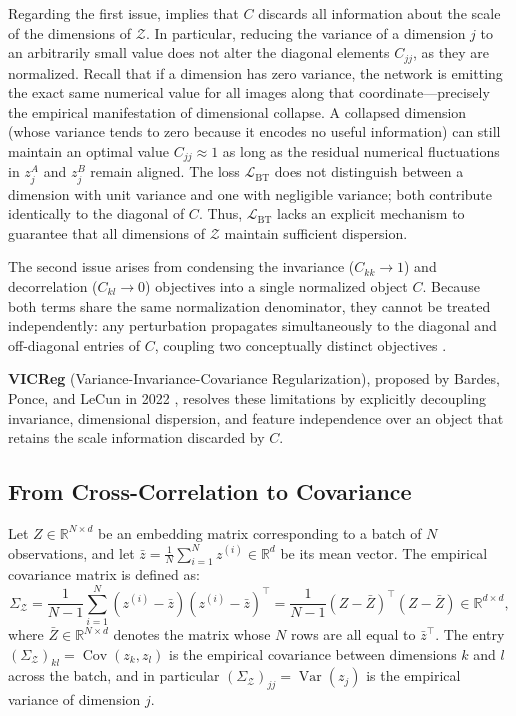\documentclass[11pt, oneside, openany]{book}
\DeclareMathOperator{\Var}{Var}
\DeclareMathOperator{\Cov}{Cov}
\begin{document}
Regarding the first issue,  implies that $C$ discards all information about the scale of the dimensions of $\mathcal{Z}$. In particular, reducing the variance of a dimension $j$ to an arbitrarily small value does not alter the diagonal elements $C_{jj}$, as they are normalized. Recall that if a dimension has zero variance, the network is emitting the exact same numerical value for all images along that coordinate---precisely the empirical manifestation of dimensional collapse. A collapsed dimension (whose variance tends to zero because it encodes no useful information) can still maintain an optimal value $C_{jj} \approx 1$ as long as the residual numerical fluctuations in $z_{j}^{A}$ and $z_{j}^{B}$ remain aligned. The loss $\mathcal{L}_{\text{BT}}$ does not distinguish between a dimension with unit variance and one with negligible variance; both contribute identically to the diagonal of $C$. Thus, $\mathcal{L}_{\text{BT}}$ lacks an explicit mechanism to guarantee that all dimensions of $\mathcal{Z}$ maintain sufficient dispersion.

The second issue arises from condensing the invariance ($C_{kk} \to 1$) and decorrelation ($C_{kl} \to 0$) objectives into a single normalized object $C$. Because both terms share the same normalization denominator, they cannot be treated independently: any perturbation propagates simultaneously to the diagonal and off-diagonal entries of $C$, coupling two conceptually distinct objectives \cite{bardes2022vicreg}.

\textbf{VICReg} (Variance-Invariance-Covariance Regularization), proposed by Bardes, Ponce, and LeCun in 2022 \cite{bardes2022vicreg}, resolves these limitations by explicitly decoupling invariance, dimensional dispersion, and feature independence over an object that retains the scale information discarded by $C$.

\subsection{From Cross-Correlation to Covariance}
\label{sec:5.3.1}

\begin{definition}
\label{def:5.3}
Let $Z \in \mathbb{R}^{N \times d}$ be an embedding matrix corresponding to a batch of $N$ observations, and let $\bar{z} = \frac{1}{N}\sum_{i=1}^{N} z^{(i)} \in \mathbb{R}^{d}$ be its mean vector. The empirical covariance matrix is defined as:
\begin{equation}
\label{eq:5.22}
\Sigma_{\mathcal{Z}} = \frac{1}{N - 1}\sum_{i=1}^{N} (z^{(i)} - \bar{z})(z^{(i)} - \bar{z})^{\top} = \frac{1}{N - 1}(Z - \bar{Z})^{\top}(Z - \bar{Z}) \in \mathbb{R}^{d \times d},
\end{equation}
where $\bar{Z} \in \mathbb{R}^{N \times d}$ denotes the matrix whose $N$ rows are all equal to $\bar{z}^{\top}$. The entry $(\Sigma_{\mathcal{Z}})_{kl} = \Cov(z_{k}, z_{l})$ is the empirical covariance between dimensions $k$ and $l$ across the batch, and in particular $(\Sigma_{\mathcal{Z}})_{jj} = \Var(z_{j})$ is the empirical variance of dimension $j$.
\end{definition}
\end{document}
